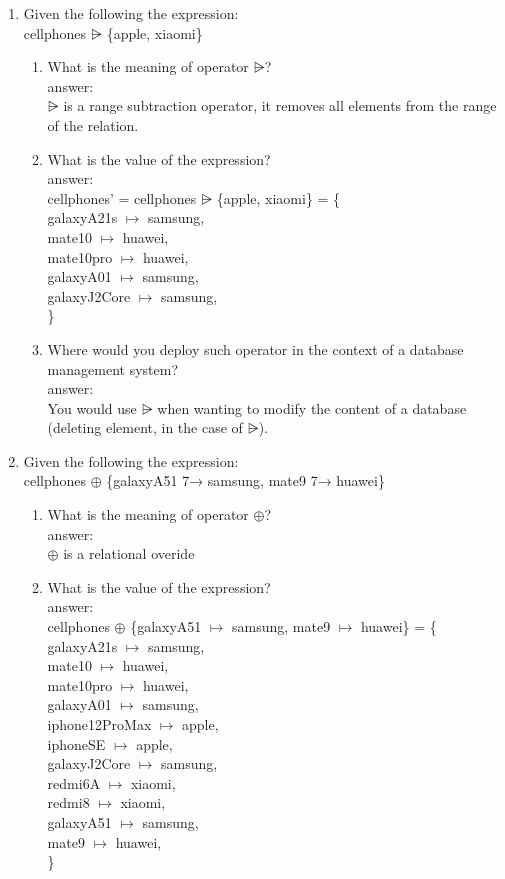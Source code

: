 \documentclass[12pt]{article}
\begin{document}
\begin{enumerate}
	\item Given the following the expression:\\ cellphones $\nrres$ \{apple, xiaomi\}
	\begin{enumerate} 
		\item What is the meaning of operator $\nrres$?\\
		answer:\\
		$\nrres$ is a range subtraction operator, it removes all elements from the range of the relation.
		\item What is the value of the expression?\\
		answer:\\	
		cellphones' = cellphones $\nrres$ \{apple, xiaomi\} = \{\\
		galaxyA21s $\mapsto$ samsung,\\
		mate10 $\mapsto$ huawei,\\
		mate10pro $\mapsto$ huawei,\\
		galaxyA01 $\mapsto$ samsung,\\
		galaxyJ2Core $\mapsto$ samsung,\\
		\}
		\item Where would you deploy such operator in the context of a database management system?\\
		answer:\\
		You would use $\nrres$ when wanting to modify the content of a database (deleting element, in the case of $\nrres$).
	\end{enumerate}
	
	\item Given the following the expression:\\ cellphones $\oplus$ \{galaxyA51 7→ samsung, mate9 7→ huawei\}
	\begin{enumerate} 
		\item What is the meaning of operator $\oplus$? \\
		\indent answer: \\
		\indent $\oplus$ is a relational overide

		\item What is the value of the expression?	\\
		answer: \\ 
		\indent cellphones $\oplus$ \{galaxyA51 $\mapsto$ samsung, mate9 $\mapsto$ huawei\} = \{ \\ 
		galaxyA21s $\mapsto$ samsung,\\
		mate10 $\mapsto$ huawei,\\
		mate10pro $\mapsto$ huawei,\\
		galaxyA01 $\mapsto$ samsung,\\
		iphone12ProMax $\mapsto$ apple,\\
		iphoneSE $\mapsto$ apple,\\
		galaxyJ2Core $\mapsto$ samsung,\\
		redmi6A $\mapsto$ xiaomi,\\
		redmi8 $\mapsto$ xiaomi,\\
		galaxyA51 $\mapsto$ samsung,\\
		mate9 $\mapsto$ huawei,\\
		\}


\end{enumerate}
\end{enumerate}
\end{document}
